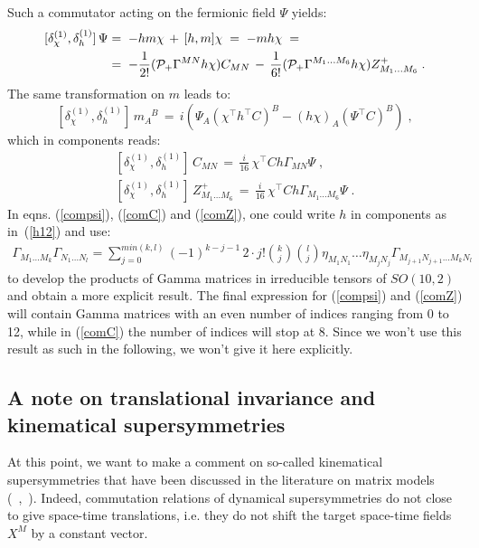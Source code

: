 \documentclass[a4paper,11pt]{article}
\def\G{{\Gamma}}
\def\E{{\eta}}
\begin{document}
Such a commutator acting on the fermionic field $\Psi$ yields: 
\begin{align} \label{compsi}
[\delta_{\chi}^{(1)},\delta_{h}^{(1)}] \,\Psi &=\; -h m \chi \,+\,
[h,m]\chi \;= \; -m h\chi \;=\notag \\
&= \;- \frac{1}{2!} ({\cal P}_+ \Gamma^{MN}h\chi) C_{MN} \,-\, 
\frac{1}{6!} ({\cal P}_+ \Gamma^{M_1 \ldots M_6}h\chi)Z^+_{M_1 \ldots M_6}\;. 
\end{align} 
The same transformation on $m$ leads to: 
\begin{equation}\label{comM}
[\delta_{\chi}^{(1)},\delta_{h}^{(1)}]\,m_A^{\phantom{A}B}\,=\,
i\left(\Psi_A(\chi^{\top}h^{\top}C)^B -(h\chi)_A(\Psi^{\top}C)^B\right)\;, 
\end{equation}
which in components reads:
\begin{align}\label{comC}
[\delta_{\chi}^{(1)},\delta_{h}^{(1)}] \,C_{MN}\,=\,\frac{i}{16}\,\chi^{\top}C h\Gamma_{MN}\Psi\;,\\
\label{comZ}
[\delta_{\chi}^{(1)},\delta_{h}^{(1)}]\, Z^+_{M_1 \ldots M_6} \,=\,
\frac{i}{16}\,\chi^{\top}C h\Gamma_{M_1 \ldots M_6}\Psi\;.
\end{align}
In eqns. (\ref{compsi}), (\ref{comC}) and (\ref{comZ}), one could write $h$ in components as in~(\ref{h12}) 
and use:
\begin{align}\label{GamProd}
\G_{M_{1}\ldots M_{k}}\G_{N_{1}\ldots N_{l}}=\sum_{j=0}^{min(k,l)} (-1)^{k-j-1}\,2\cdot j! \binom{k}{j} \binom{l}{j} 
\E_{M_1 N_1}\ldots \E_{M_{j} N_{j}}\G_{M_{j+1} N_{j+1}\ldots M_{k} N_{l}} 
\end{align}
to develop the products of Gamma matrices in irreducible tensors of $SO(10,2)$ and obtain 
a more explicit result. The final expression for (\ref{compsi}) and (\ref{comZ}) will contain Gamma matrices 
with an even number of indices ranging from 0 to 12, while in (\ref{comC}) the number of indices will stop at 8. 
Since we won't use this result as such in the following, we won't give it here explicitly.

\subsection{A note on translational invariance and kinematical supersymmetries} 
At this point, we want to make a comment on so-called kinematical supersymmetries that have been discussed
in the literature on matrix models (~\cite{IKKT},~\cite{AIKO}). Indeed, commutation relations of dynamical 
supersymmetries do not close to give space-time translations, i.e. they do not shift the target
space-time fields $X^M$ by a constant vector.
\end{document}
